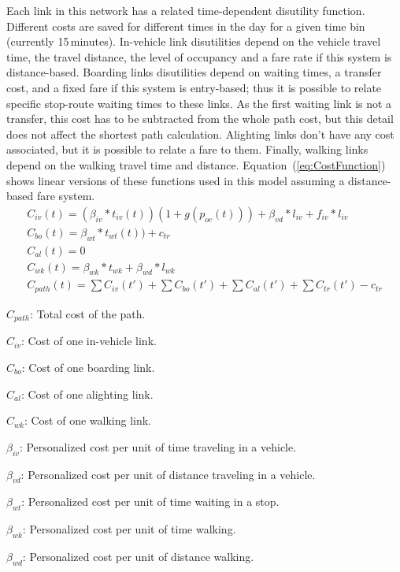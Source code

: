 Each link in this network has a related time-dependent disutility function. Different costs are saved for different times in the day for a given time bin (currently 15\,minutes). In-vehicle link disutilities depend on the vehicle travel time, the travel distance, the level of occupancy and a fare rate if this system is distance-based. Boarding links disutilities depend on waiting times, a transfer cost, and a fixed fare if this system is entry-based; thus it is possible to relate specific stop-route waiting times to these links. As the first waiting link is not a transfer, this cost has to be subtracted from the whole path cost, but this detail does not affect the shortest path calculation. Alighting links don't have any cost associated, but it is possible to relate a fare to them. Finally, walking links depend on the walking travel time and distance. Equation~(\ref{eq:CostFunction}) shows linear versions of these functions used in this model assuming a distance-based fare system.
%
\begin{equation}\label{eq:CostFunction}
	\begin{array}{l}
		C_{iv}(t) = (\beta_{iv}*t_{iv}(t))(1+g(p_{oc}(t))) + \beta_{vd}*l_{iv} + f_{iv}*l_{iv}\\
		C_{bo}(t) = \beta_{wt}*t_{wt}(t)) + c_{tr}\\
		C_{al}(t) = 0\\
		C_{wk}(t) = \beta_{wk}*t_{wk} + \beta_{wd}*l_{wk}\\
		C_{path}(t) = \sum{C_{iv}(t')} + \sum{C_{bo}(t')} + \sum{C_{al}(t')} + \sum{C_{tr}(t')} - c_{tr}
	\end{array}
\end{equation}

$C_{path}$: Total cost of the path.

$C_{iv}$: Cost of one in-vehicle link.

$C_{bo}$: Cost of one boarding link.

$C_{al}$: Cost of one alighting link.

$C_{wk}$: Cost of one walking link.

$\beta_{iv}$: Personalized cost per unit of time traveling in a vehicle.

$\beta_{vd}$: Personalized cost per unit of distance traveling in a vehicle.

$\beta_{wt}$: Personalized cost per unit of time waiting in a stop.

$\beta_{wk}$: Personalized cost per unit of time walking.

$\beta_{wd}$: Personalized cost per unit of distance walking.

